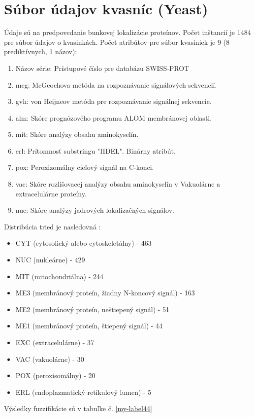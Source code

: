 \section{Súbor údajov kvasníc (Yeast)}
Údaje sú na predpovedanie bunkovej lokalizácie proteínov. 
Počet inštancií je  1484 pre súbor údajov o kvasinkách.
 Počet atribútov pre súbor kvasiniek je 9 (8 prediktívnych, 1 názov): 
\begin{enumerate}
\item Názov série: Prístupové číslo pre databázu SWISS-PROT
\item mcg: McGeochova metóda na rozpoznávanie signálových sekvencií.
\item gvh: von Heijneov metóda pre rozpoznávanie signálnej sekvencie.
\item alm: Skóre prognózového programu ALOM membránovej oblasti.
\item mit: Skóre analýzy obsahu aminokyselín.
\item erl: Prítomnosť substringu "HDEL". Binárny atribút.
\item pox: Peroxizomálny cieľový signál na C-konci.
\item vac: Skóre rozlišovacej analýzy obsahu aminokyselín v
Vakuolárne a extracelulárne proteíny.
\item nuc: Skóre analýzy jadrových lokalizačných signálov.

\end{enumerate}
 Distribúcia tried je nasledovná : 
\begin{itemize}
\item CYT (cytosolický alebo cytoskeletálny) - 463
\item NUC (nukleárne)  - 429
\item MIT (mitochondriálna)  - 244
\item ME3 (membránový proteín, žiadny N-koncový signál) -  163
\item ME2 (membránový proteín, neštiepený signál)  - 51
\item ME1 (membránový proteín, štiepený signál)  - 44
\item EXC (extracelulárne)  - 37
\item VAC (vakuolárne)  - 30
\item POX (peroxisomálny) - 20
\item ERL (endoplazmatický retikulový lumen) -  5
\end{itemize}
Výsledky fuzzifikácie sú v tabuľke č. \ref{my-label44}
